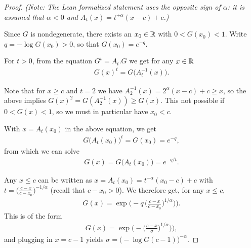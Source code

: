\begin{proof}

  \emph{(Note: The Lean formalized statement uses the opposite sign of $\alpha$:
  it is assumed that $\alpha < 0$ and $A_t(x) = t^{+\alpha} (x-c) + c$.)}

  Since $G$ is nondegenerate, there exists an $x_0 \in \mathbb{R}$
  with $0 < G(x_0) < 1$. Write $q = -\log G(x_0) > 0$,
  so that $G(x_0) = e^{-q}$.

  For $t > 0$, from the equation $G^{t} = A_t . G$
  we get for any $x \in \mathbb{R}$
  \begin{align*}
  G(x)^t = G \big( A_t^{-1}(x) \big) . %
  \end{align*}

  Note that for $x \ge c$ and $t = 2$ we have $A_2^{-1}(x) = 2^{\alpha}(x-c) + c \ge x$,
  so the above implies $G(x)^2 = G(A_2^{-1}(x)) \ge G(x)$.
  This not possible if $0 < G(x) < 1$, so we must in particular have $x_0 < c$.

  With $x = A_t(x_0)$ in the above equation, %
  we get
  \begin{align*}
    G\big( A_t(x_0) \big)^{t} = G(x_0) = e^{- q},
  \end{align*}
  from which we can solve
  \begin{align*}
    G(x) = G\big( A_t(x_0) \big) = e^{-q/t} .
  \end{align*}

  Any $x \le c$ can be written as $x = A_t(x_0) = t^{-\alpha} (x_0-c) + c$
  with $t = \big( \frac{c - x}{c - x_0} \big)^{-1/\alpha}$
  (recall that $c - x_0 > 0$).
  We therefore get, for any $x \le c$,
  \begin{align*}
    G(x) = \exp \Big( - q \, \big( \frac{c - x}{c - x_0} \big)^{1/\alpha} \big) \Big) .
  \end{align*}
  This is of the form
  \begin{align*}
    G(x) = \exp \Big( - \big( \frac{c - x}{\sigma} \big)^{1/\alpha} \big) \Big) ,
  \end{align*}
  and plugging in $x = c - 1$ yields $\sigma = \big(- \log G(c-1)\big)^{-\alpha}$.
\end{proof}


